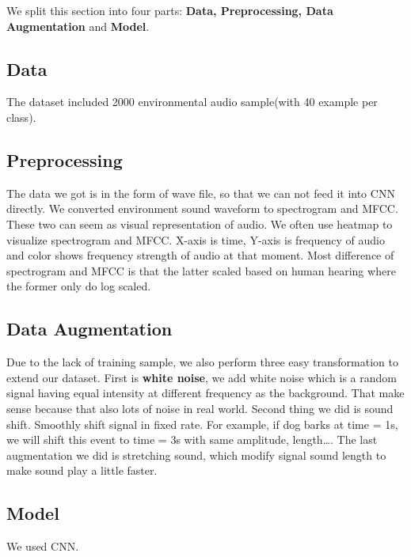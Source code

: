 We split this section into four parts: \textbf{Data, Preprocessing, Data Augmentation} and \textbf{Model}.
\subsection{Data}
The dataset included 2000 environmental audio sample(with 40 example per class).
\subsection{Preprocessing}
The data we got is in the form of wave file, so that we can not feed it into CNN directly. We converted environment sound waveform to spectrogram and MFCC. 
These two can seem as visual representation of audio. We often use heatmap to visualize spectrogram and MFCC. X-axis is time, Y-axis is frequency of audio and color shows frequency strength of audio at that moment. 
Most difference of spectrogram and MFCC is that the latter scaled based on human hearing where the former only do log scaled.
\begin{comment}
Spectrogram/ MFCC fig. here
\end{comment}

\subsection{Data Augmentation}
Due to the lack of training sample, we also perform three easy transformation to extend our dataset. 
First is \textbf{white noise}, we add white noise which is a random signal having equal intensity at different frequency as the background.
That make sense because that also lots of noise in real world. Second thing we did is sound shift. Smoothly shift signal in fixed rate. For example, if dog barks at time = 1s, we will shift this event to time = 3s with same amplitude, length\ldots. 
The last augmentation we did is stretching sound, which modify signal sound length to make sound play a little faster.
\subsection{Model}
We used CNN.
